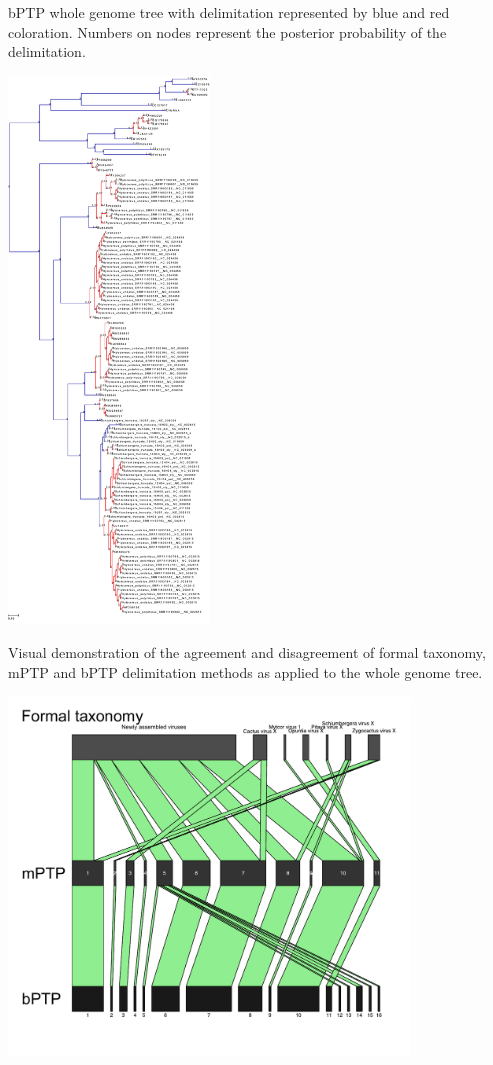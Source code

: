 \documentclass[11pt]{article}
\begin{document}
\begin{suppfigure}
\centering
\caption{
bPTP whole genome tree with delimitation represented by blue and red coloration. Numbers on nodes represent the posterior probability of the delimitation.
}
\includegraphics[width=0.4\textwidth]{supplementaryinfo/bptp.pdf}
\label{fig:genetree5}
\end{suppfigure}
\clearpage

\begin{suppfigure}
\centering
\caption{
Visual demonstration of the agreement and disagreement of formal taxonomy, mPTP and bPTP delimitation methods as applied to the whole genome tree.
}
\includegraphics[width=0.8\textwidth]{supplementaryinfo/bipartite_web-edited.pdf}
\label{fig:genetree5}
\end{suppfigure}
\clearpage
\end{document}
